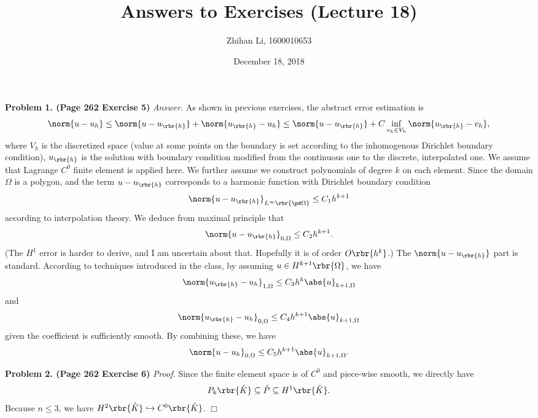 \documentclass[english, nochinese]{pnote}
\title{Answers to Exercises (Lecture 18)}
\author{Zhihan Li, 1600010653}
\date{December 18, 2018}
\begin{document}
\maketitle

\textbf{Problem 1. (Page 262 Exercise 5)} \textit{Answer.} As shown in previous exercises, the abstract error estimation is
\begin{equation}
\norm{ u - u_h } \le \norm{ u - u_{\rbr{h}} } + \norm{ u_{\rbr{h}} - u_h } \le \norm{ u - u_{\rbr{h}} } + C \inf_{ v_h \in V_h } \norm{ u_{\rbr{h}} - v_h },
\end{equation}
where $V_h$ is the discretized space (value at some points on the boundary is set according to the inhomogenous Dirichlet boundary condition), $u_{\rbr{h}}$ is the solution with boundary condition modified from the continuous one to the discrete, interpolated one. We assume that Lagrange $C^0$ finite element is applied here. We further assume we construct polynomials of degree $k$ on each element. Since the domain $\Omega$ is a polygon, and the term $ u - u_{\rbr{h}} $ corresponds to a harmonic function with Dirichlet boundary condition
\begin{equation}
\norm{ u - u_{\rbr{h}} }_{ L^{\infty} \rbr{ \pd \Omega } } \le C_1 h^{ k + 1 }
\end{equation}
according to interpolation theory. We deduce from maximal principle that
\begin{equation}
\norm{ u - u_{\rbr{h}} }_{ 0, \Omega } \le C_2 h^{ k + 1 }.
\end{equation}
(The $H^1$ error is harder to derive, and I am uncertain about that. Hopefully it is of order $ O \rbr{h^k} $.) The $ \norm{ u - u_{\rbr{h}} } $ part is standard. According to techniques introduced in the class, by assuming $ u \in H^{ k + 1 } \rbr{\Omega} $, we have
\begin{equation}
\norm{ u_{\rbr{h}} - u_h }_{ 1, \Omega } \le C_3 h^k \abs{u}_{ k + 1, \Omega }
\end{equation}
and
\begin{equation}
\norm{ u_{\rbr{h}} - u_h }_{ 0, \Omega } \le C_4 h^{ k + 1 } \abs{u}_{ k + 1, \Omega }
\end{equation}
given the coefficient is sufficiently smooth. By combining these, we have
\begin{equation}
\norm{ u - u_h }_{ 0, \Omega } \le C_5 h^{ k + 1 } \abs{u}_{ k + 1, \Omega }.
\end{equation}

\textbf{Problem 2. (Page 262 Exercise 6)} \textit{Proof.} Since the finite element space is of $C^0$ and piece-wise smooth, we directly have
\begin{equation}
P_k \rbr{\hat{K}} \subseteq \hat{P} \subseteq H^1 \rbr{\hat{K}}.
\end{equation}
Because $ n \le 3 $, we have $ H^2 \rbr{\hat{K}} \hookrightarrow C^0 \rbr{\hat{K}} $.
\hfill$\Box$
\end{document}
